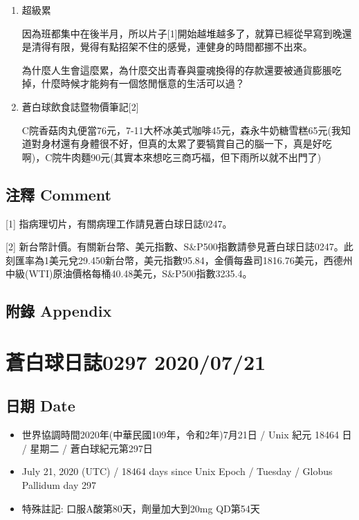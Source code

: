 \documentclass[a5paper, 11pt
]{book}
\providecommand{\tightlist}{%
  \setlength{\itemsep}{0pt}\setlength{\parskip}{0pt}}
\begin{document}
\begin{enumerate}
\def\labelenumi{\arabic{enumi}.}
\item
  超級累

  因為班都集中在後半月，所以片子{[}1{]}開始越堆越多了，就算已經從早寫到晚還是清得有限，覺得有點招架不住的感覺，連健身的時間都挪不出來。

  為什麼人生會這麼累，為什麼交出青春與靈魂換得的存款還要被通貨膨脹吃掉，什麼時候才能夠有一個悠閒愜意的生活可以過？
\item
  蒼白球飲食誌暨物價筆記{[}2{]}

  C院香菇肉丸便當76元，7-11大杯冰美式咖啡45元，森永牛奶糖雪糕65元(我知道對身材還有身體很不好，但真的太累了要犒賞自己的腦一下，真是好吃啊)，C院牛肉麵90元(其實本來想吃三商巧福，但下雨所以就不出門了)
\end{enumerate}

\hypertarget{ux6ce8ux91cb-comment-49}{%
\subsection{注釋 Comment}\label{ux6ce8ux91cb-comment-49}}

{[}1{]} 指病理切片，有關病理工作請見蒼白球日誌0247。

{[}2{]}
新台幣計價。有關新台幣、美元指數、S\&P500指數請參見蒼白球日誌0247。此刻匯率為1美元兌29.450新台幣，美元指數95.84，金價每盎司1816.76美元，西德州中級(WTI)原油價格每桶40.48美元，S\&P500指數3235.4。

\hypertarget{ux9644ux9304-appendix-49}{%
\subsection{附錄 Appendix}\label{ux9644ux9304-appendix-49}}

\hypertarget{ux84bcux767dux7403ux65e5ux8a8c0297-20200721}{%
\section{蒼白球日誌0297
2020/07/21}\label{ux84bcux767dux7403ux65e5ux8a8c0297-20200721}}

\hypertarget{ux65e5ux671f-date-50}{%
\subsection{日期 Date}\label{ux65e5ux671f-date-50}}

\begin{itemize}
\tightlist
\item
  世界協調時間2020年(中華民國109年，令和2年)7月21日 / Unix 紀元 18464 日
  / 星期二 / 蒼白球紀元第297日
\item
  July 21, 2020 (UTC) / 18464 days since Unix Epoch / Tuesday / Globus
  Pallidum day 297
\item
  特殊註記: 口服A酸第80天，劑量加大到20mg QD第54天
\end{itemize}
\end{document}
